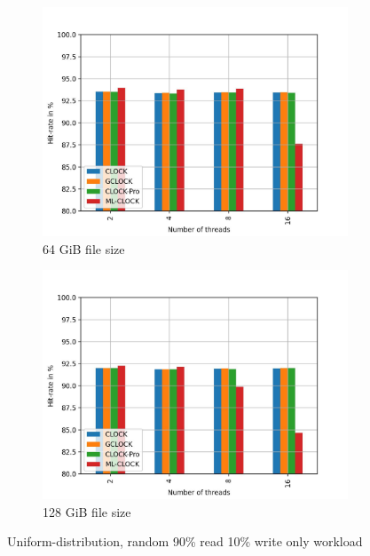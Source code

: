 \documentclass[
	12pt,
	a4paper,
	abstract,
	bibliography=totoc,
	chapterprefix,
	headings=openright,
	numbers=endperiod,
	parskip=half,
	twoside,
]{scrreprt}
\begin{document}
\begin{figure}[H]
\begin{subfigure}{0.4\textwidth}
		\includegraphics[width=\textwidth]{multi_64_gb_rw_90to10_uniform.jpg}		
		\caption{64 GiB file size}
		\label{fig:rw_90to10 64 uniform}
	\end{subfigure}
	\hfill
	\begin{subfigure}{0.4\textwidth}
		\includegraphics[width=\textwidth]{multi_128_gb_rw_90to10_uniform.jpg}		
		\caption{128 GiB file size}
		\label{fig:rw_90to10 128 uniform}
	\end{subfigure}
	\caption{Uniform-distribution, random 90\% read 10\% write only workload}
	\label{fig:multi uniform rw_90to10}
\end{figure}
\end{document}

